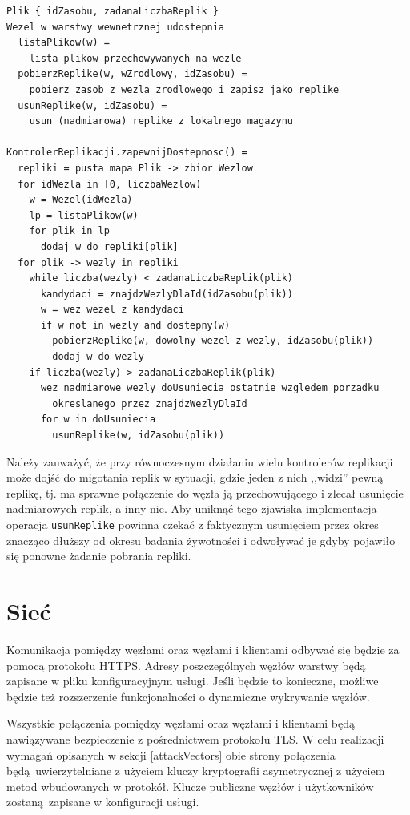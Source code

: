 \documentclass[a4paper,11pt]{article}
\begin{document}
\begin{lstlisting}
Plik { idZasobu, zadanaLiczbaReplik }
Wezel w warstwy wewnetrznej udostepnia
  listaPlikow(w) =
    lista plikow przechowywanych na wezle
  pobierzReplike(w, wZrodlowy, idZasobu) =
    pobierz zasob z wezla zrodlowego i zapisz jako replike
  usunReplike(w, idZasobu) =
    usun (nadmiarowa) replike z lokalnego magazynu

KontrolerReplikacji.zapewnijDostepnosc() =
  repliki = pusta mapa Plik -> zbior Wezlow
  for idWezla in [0, liczbaWezlow)
    w = Wezel(idWezla)
    lp = listaPlikow(w)
    for plik in lp
      dodaj w do repliki[plik]
  for plik -> wezly in repliki
    while liczba(wezly) < zadanaLiczbaReplik(plik)
      kandydaci = znajdzWezlyDlaId(idZasobu(plik))
      w = wez wezel z kandydaci
      if w not in wezly and dostepny(w)
        pobierzReplike(w, dowolny wezel z wezly, idZasobu(plik))
        dodaj w do wezly
    if liczba(wezly) > zadanaLiczbaReplik(plik)
      wez nadmiarowe wezly doUsuniecia ostatnie wzgledem porzadku
        okreslanego przez znajdzWezlyDlaId
      for w in doUsuniecia
        usunReplike(w, idZasobu(plik))
\end{lstlisting}

Należy zauważyć, że przy równoczesnym działaniu wielu kontrolerów
replikacji może dojść do migotania replik w sytuacji, gdzie jeden z nich
,,widzi'' pewną replikę, tj. ma sprawne połączenie do węzła ją
przechowującego i zlecał usunięcie nadmiarowych replik, a inny nie.
Aby uniknąć tego zjawiska implementacja operacja \texttt{usunReplike}
powinna czekać z faktycznym usunięciem przez okres znacząco dłuższy
od okresu badania żywotności i odwoływać je gdyby pojawiło się ponowne
żadanie pobrania repliki.


\section{Sieć}
Komunikacja pomiędzy węzłami oraz węzłami i klientami odbywać się będzie
za pomocą protokołu HTTPS.  Adresy poszczególnych węzłów warstwy
będą zapisane w pliku konfiguracyjnym usługi.  Jeśli będzie to
konieczne, możliwe będzie też rozszerzenie funkcjonalności o dynamiczne
wykrywanie węzłów.

Wszystkie połączenia pomiędzy węzłami oraz węzłami i klientami będą
nawiązywane bezpieczenie z pośrednictwem protokołu TLS.  W celu
realizacji wymagań opisanych w sekcji \ref{attackVectors} obie strony
połączenia będą uwierzytelniane z użyciem kluczy kryptografii
asymetrycznej z użyciem metod wbudowanych w protokół.  Klucze publiczne
węzłów i użytkowników zostaną zapisane w konfiguracji usługi.
\end{document}
